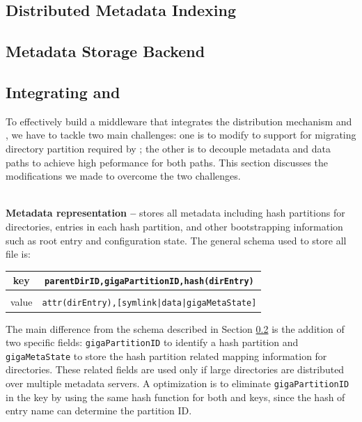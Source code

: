\subsection{Distributed Metadata Indexing}
\label{design.giga}


\subsection{Metadata Storage Backend}
\label{design.tablefs}


\subsection{Integrating \giga{} and \tfs{}}
\label{design.integration}

To effectively build a middleware that integrates
the \giga distribution mechanism and \tfs,
we have to tackle two main challenges:
one is to modify \tfs to support for
migrating directory partition required by \giga;
the other is to decouple metadata and data paths to
achieve high peformance for both paths.
This section discusses the modifications we made to
overcome the two challenges.


~\\
\textbf{Metadata representation -- }
\tfs stores all metadata including \giga hash
partitions for directories, entries in each hash partition, and other
bootstrapping information such as root entry and \giga configuration state.
The general schema used to store all file is:

\begin{table}[!htc]
\begin{tabular}{c|c}
key & \texttt{parentDirID,gigaPartitionID,hash(dirEntry)} \\
\midrule \\
value & \texttt{attr(dirEntry),[symlink|data|gigaMetaState]} \\
\end{tabular}
\label{tab:keyschema}
\end{table}

The main difference from the \tfs schema described in Section
\ref{design.tablefs} is the addition of two \giga specific fields:
\texttt{gigaPartitionID} to identify a
\giga hash partition and \texttt{gigaMetaState} to store the
hash partition related mapping information for directories.
These \giga related fields are used only
if large directories are distributed over multiple metadata servers.
A optimization is to eliminate \texttt{gigaPartitionID} in the key
by using the same hash function for both \giga and \tfs keys,
since the hash of entry name can determine the partition ID.

